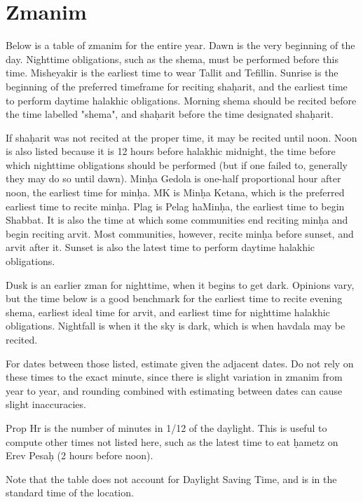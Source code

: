 \chapter{Zmanim}

Below is a table of zmanim for the entire year. Dawn is the very beginning of the day. Nighttime obligations, such as the shema, must be performed before this time. Misheyakir is the earliest time to wear Tallit and Tefillin.  Sunrise is the beginning of the preferred timeframe for reciting sha\d{h}arit, and the earliest time to perform daytime halakhic obligations. Morning shema should be recited before the time labelled "shema", and sha\d{h}arit before the time designated sha\d{h}arit.

If sha\d{h}arit was not recited at the proper time, it may be recited until noon. Noon is also listed because it is 12 hours before halakhic midnight, the time before which nighttime obligations should be performed (but if one failed to, generally they may do so until dawn). Min\d{h}a Gedola is one-half proportional hour after noon, the earliest time for min\d{h}a. MK is Min\d{h}a Ketana, which is the preferred earliest time to recite min\d{h}a. Plag is Pelag haMin\d{h}a, the earliest time to begin Shabbat. It is also the time at which some communities end reciting min\d{h}a and begin reciting arvit. Most communities, however, recite min\d{h}a before sunset, and arvit after it. Sunset is also the latest time to perform daytime halakhic obligations.

Dusk is an earlier zman for nighttime, when it begins to get dark. Opinions vary, but the time below is a good benchmark for the earliest time to recite evening shema, earliest ideal time for arvit, and earliest time for nighttime halakhic obligations. Nightfall is when it the sky is dark, which is when havdala may be recited.

For dates between those listed, estimate given the adjacent dates. Do not rely on these times to the exact minute, since there is slight variation in zmanim from year to year, and rounding combined with estimating between dates can cause slight inaccuracies.

Prop Hr is the number of minutes in 1/12 of the daylight. This is useful to compute other times not listed here, such as the latest time to eat \d{h}ametz on Erev Pesa\d{h} (2 hours before noon).

Note that the table does not account for Daylight Saving Time, and is in the standard time of the location.


